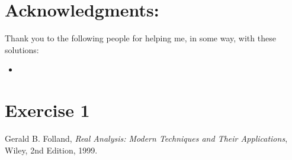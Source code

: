 \documentclass[twoside, titlepage]{amsart}
\makeatletter
\theoremstyle{plain} %
\theoremstyle{definition}
\theoremstyle{remark}
\theoremstyle{notation}
\renewenvironment{proof}[1][\proofname]{\par
	\pushQED{\qed}%
	\normalfont \topsep6\p@\@plus6\p@\relax
	\trivlist
	\item\relax
	{\itshape
		#1\@addpunct{.}}\hspace\labelsep\ignorespaces
}{%
\popQED\endtrivlist\@endpefalse
}
\makeatother
\begin{document}
	\section*{Acknowledgments:}
	Thank you to the following people for helping me, in some way, with these solutions:
	\begin{itemize}
		\item 
	\end{itemize}
	

\clearpage

\section*{Exercise 1}

	

\begin{proof}
	
	
	
\end{proof}

\clearpage

	\begin{thebibliography}{"Fol99"}
		Gerald B. Folland,
		\emph{Real Analysis: Modern Techniques and Their Applications},
		Wiley,
		2nd Edition,
		1999.	
	\end{thebibliography}
\end{document}
